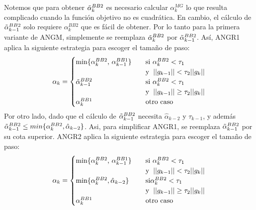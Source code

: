 \documentclass[conference]{IEEEtran}
\begin{document}
    Notemos que para obtener $\Tilde{\alpha}_k^{BB2}$ es necesario calcular $\alpha_k^{MG}$ lo que resulta complicado cuando la función objetivo no es cuadrática. En cambio, el cálculo de $\Tilde{\alpha}_{k-1}^{BB2}$ solo requiere $\alpha_k^{BB2}$ que es fácil de obtener. Por lo tanto para la primera variante de ANGM, simplemente se reemplaza $\Tilde{\alpha}_k^{BB2}$ por $\Tilde{\alpha}_{k-1}^{BB2}$. Así, ANGR1 aplica la siguiente estrategia para escoger el tamaño de paso:
    \begin{align}
        \alpha_k =
         \begin{cases}
           \text{min\{$\alpha_k^{BB2}$, $\alpha_{k-1}^{BB1}$\}} &\quad\text{si } \alpha_k^{BB2}<\tau_1 \hspace{0.2cm}\\
           \text{} &\quad\text{y} \hspace{0.2cm} ||g_{k-1}|| < \tau_2||g_k||\\
            \text{$\Tilde{\alpha}_{k-1}^{BB2}$} &\quad\text{si  } \alpha_k^{BB2}<\tau_1 \hspace{0.2cm}\\
            \text{} &\quad\text{y} \hspace{0.2cm} ||g_{k-1}|| \geq \tau_2||g_k||\\
            \text{$\alpha_k^{BB1}$} &\quad\text{otro caso}
         \end{cases}
    \end{align}
    Por otro lado, dado que el cálculo de $\Tilde{\alpha}_{k-1}^{BB2}$ necesita $\hat{\alpha}_{k-2}$ y $\tau_{k-1}$, y además
    $\Tilde{\alpha}_{k-1}^{BB2} \leq min\{\alpha_k^{BB2}, \hat{\alpha}_{k-2}\}$.
    Asi, para simplificar ANGR1, se reemplaza $\Tilde{\alpha}_{k-1}^{BB2}$ por su cota superior. ANGR2 aplica la siguiente estrategia para escoger el tamaño de paso:
    \begin{align}
        \alpha_k =
         \begin{cases}
           \text{min\{$\alpha_k^{BB2}$, $\alpha_{k-1}^{BB1}$\}} &\quad\text{si } \alpha_k^{BB2}<\tau_1 \hspace{0.2cm}\\
           \text{} &\quad\text{y} \hspace{0.2cm} ||g_{k-1}|| < \tau_2||g_k||\\
            \text{min$\{\alpha_k^{BB2}, \hat{\alpha}_{k-2}\}$} &\quad\text{si} \alpha_k^{BB2}<\tau_1 \hspace{0.2cm}\\
            \text{} &\quad\text{y} \hspace{0.2cm} ||g_{k-1}|| \geq \tau_2||g_k||\\
            \text{$\alpha_k^{BB1}$} &\quad\text{otro caso}
         \end{cases}
    \end{align}
\end{document}
